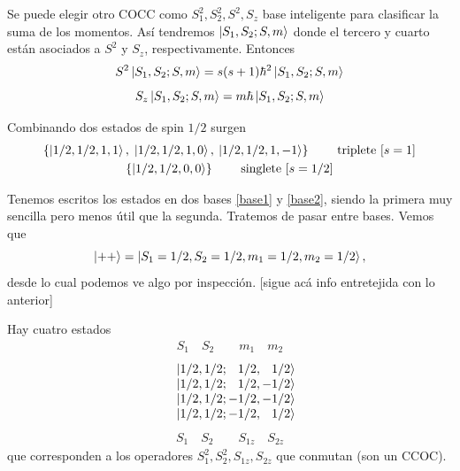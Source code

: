 \documentclass[10pt,oneside]{CBFT_book}
\begin{document}
Se puede elegir otro COCC como $S_1^2, S_2^2, S^2, S_z$ base inteligente para clasificar la
suma de los momentos. Así tendremos $\Ket{S_1, S_2 ; S, m}$ donde el tercero y cuarto están
asociados a $S^2$ y $S_z$, respectivamente. Entonces
\[
	S^2\Ket{S_1, S_2 ; S, m} = s(s+1)\hbar^2 \Ket{S_1, S_2 ; S, m} 
\]
\[
	S_z \Ket{S_1, S_2 ; S, m} = m \hbar \Ket{S_1, S_2 ; S, m}
\]

Combinando dos estados de spin $1/2$ surgen
\begin{multline}
	\{ \Ket{1/2,1/2,1,1} , \;  \Ket{1/2,1/2,1,0}, \: \Ket{1/2,1/2,1,-1} \}
	\qquad \text{ triplete } [s=1]
	\\
	\{ \Ket{1/2,1/2,0,0} \}
	\qquad \text{ singlete } [s=1/2]
	\label{base2}
\end{multline}

Tenemos escritos los estados en dos bases \eqref{base1} y \eqref{base2}, siendo la primera muy
sencilla pero menos útil que la segunda. Tratemos de pasar entre bases. Vemos que
\[
	\Ket{++} = \Ket{S_1=1/2, S_2=1/2, m_1=1/2, m_2=1/2},
\]
desde lo cual podemos ve algo por inspección.
[sigue acá info entretejida con lo anterior]

Hay cuatro estados
\[
	\begin{matrix} S_1 \quad S_2 \quad\quad m_1 \quad m_2 \end{matrix}
\]
\[
	\begin{matrix}
	&\Ket{1/2, 1/2 ; \phantom{-}1/2, \phantom{-}1/2} \\
	&\Ket{1/2, 1/2 ; \phantom{-}1/2, -1/2} \\
	&\Ket{1/2, 1/2 ; -1/2, -1/2} \\
	&\Ket{1/2, 1/2 ; -1/2, \phantom{-}1/2}
	\end{matrix}
\]	
\[	
	\begin{matrix} S_1 \quad S_2 \quad\quad S_{1z} \quad S_{2z}  \end{matrix}
\]
que corresponden a los operadores $S_ 1^2, S_2^2, S_{1z}, S_{2z}$ que conmutan (son un CCOC).
\end{document}
